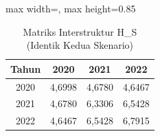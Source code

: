\begin{table}[H]
\centering
\caption{Matriks Interstruktur H\_S (Identik Kedua Skenario)} \label{tab:sampleh_s}
\begin{adjustbox}{max width=\textwidth, max height=0.85\textheight}
\begin{tabular}{|c|c|c|c|}
\hline
\textbf{Tahun} & \textbf{2020} & \textbf{2021} & \textbf{2022} \\
\hline
2020 & 4,6998 & 4,6780 & 4,6467 \\
2021 & 4,6780 & 6,3306 & 6,5428 \\
2022 & 4,6467 & 6,5428 & 6,7915 \\
\hline
\end{tabular}
\end{adjustbox}
\end{table}
